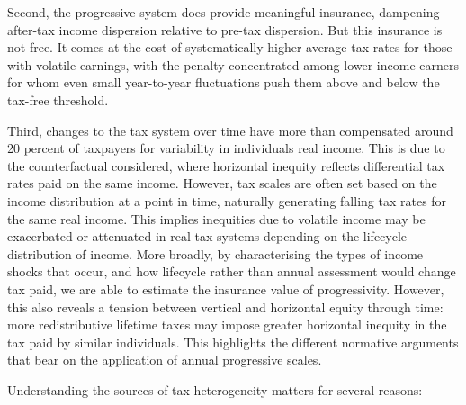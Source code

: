 \documentclass[12pt,a4paper]{article}
\begin{document}
Second, the progressive system does provide meaningful insurance, dampening after-tax income dispersion relative to pre-tax dispersion. But this insurance is not free. It comes at the cost of systematically higher average tax rates for those with volatile earnings, with the penalty concentrated among lower-income earners for whom even small year-to-year fluctuations push them above and below the tax-free threshold.

Third, changes to the tax system over time have more than compensated around 20 percent of taxpayers for variability in individuals real income. This is due to the counterfactual considered, where horizontal inequity reflects differential tax rates paid on the same income. However, tax scales are often set based on the income distribution at a point in time, naturally generating falling tax rates for the same real income. This implies inequities due to volatile income may be exacerbated or attenuated in real tax systems depending on the lifecycle distribution of income. More broadly, by characterising the types of income shocks that occur, and how lifecycle rather than annual assessment would change tax paid, we are able to estimate the insurance value of progressivity. However, this also reveals a tension between vertical and horizontal equity through time: more redistributive lifetime taxes may impose greater horizontal inequity in the tax paid by similar individuals. This highlights the different normative arguments that bear on the application of annual progressive scales.

Understanding the sources of tax heterogeneity matters for several reasons:
\end{document}
